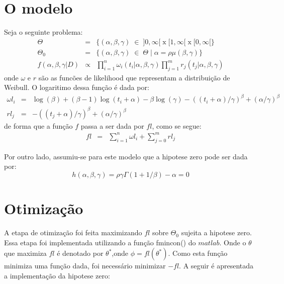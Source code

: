 \documentclass [a4paper,10pt]{article}
\begin{document}
\section{O modelo}
Seja o seguinte problema:
\begin{eqnarray*}
    \Theta & = & \{(\alpha, \beta, \gamma)\;\in\;]0, \infty[\;\mathrm{x}\;[1, \infty[\;\mathrm{x}\;[0, \infty[\}\\
    \Theta_0 & = & \{(\alpha, \beta, \gamma)\;\in\;\Theta\;|\;\alpha = \rho\mu(\beta, \gamma)\}\\
    f(\alpha, \beta, \gamma | D) & \propto & \prod_{i = 1}^n\omega_i(t_i|\alpha, \beta, \gamma)\prod_{j = 1}^mr_j(t_j|\alpha, \beta, \gamma)
\end{eqnarray*}
onde $\omega$ e $r$ são as funcões de likelihood que representam a distribuição de \mbox{Weibull}. O logaritimo dessa função é
dada por:
\begin{eqnarray}
    \omega l_i & = & \log(\beta) + (\beta - 1)\log(t_i + \alpha) - \beta\log(\gamma) - ((t_i + \alpha)/\gamma)^{\beta} + (\alpha/\gamma)^{\beta}\\
    rl_j      & = & -((t_j + \alpha)/\gamma)^{\beta} + (\alpha/\gamma)^{\beta}
\end{eqnarray}
de forma que a função $f$ passa a ser dada por $fl$, como se segue:
\begin{eqnarray}
    fl & = & \sum^n_{i =1}\omega l_i + \sum^m_{j = 0} rl_j
\end{eqnarray}

Por outro lado, assumiu-se para este modelo que a hipotese zero pode ser dada por:
\begin{equation}
    h(\alpha, \beta, \gamma) = \rho\gamma\Gamma(1 + 1/\beta) - \alpha = 0
\end{equation}

\section{Otimização}
A etapa de otimização foi feita maximizando $fl$ sobre $\Theta_0$ sujeita a hipotese zero.
Essa etapa foi implementada utilizando a função \textrm{fmincon()} do $matlab$. Onde
o $\theta$ que maximiza $fl$ é denotado por $\theta^*$,onde $\phi = fl(\theta^*)$.
Como esta função minimiza uma função dada, foi necessário minimizar $-fl$.
A seguir é apresentada a implementação da hipotese zero:
{\linespread{1.15}}
\end{document}
